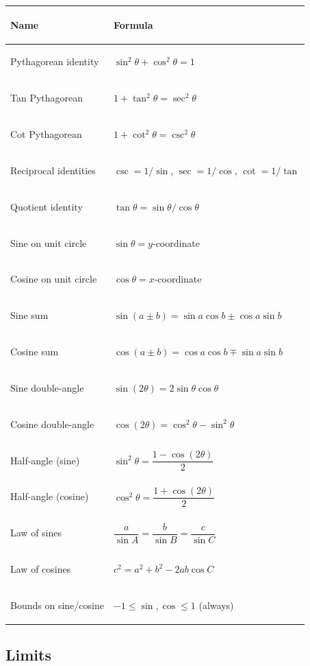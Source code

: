 \documentclass[11pt, letterpaper]{article}
\begin{document}
\noindent
{\small\renewcommand{\arraystretch}{1.6}
\begin{tabularx}{\textwidth}{>{\bfseries\raggedright\arraybackslash}p{4cm}
                              >{\raggedright\arraybackslash}X}
\toprule
\rowcolor{tableheaderpurple}
\textbf{Name} & \textbf{Formula} \\
\midrule
\rowcolor{rowPu} Pythagorean identity     & $\sin^2\theta + \cos^2\theta = 1$ \\
\rowcolor{rowA}  Tan Pythagorean          & $1 + \tan^2\theta = \sec^2\theta$ \\
\rowcolor{rowPu} Cot Pythagorean          & $1 + \cot^2\theta = \csc^2\theta$ \\
\rowcolor{rowA}  Reciprocal identities    & $\csc = 1/\sin$, \; $\sec = 1/\cos$, \; $\cot = 1/\tan$ \\
\rowcolor{rowPu} Quotient identity        & $\tan\theta = \sin\theta / \cos\theta$ \\
\rowcolor{rowA}  Sine on unit circle      & $\sin\theta = y$-coordinate \\
\rowcolor{rowPu} Cosine on unit circle    & $\cos\theta = x$-coordinate \\
\rowcolor{rowA}  Sine sum                 & $\sin(a \pm b) = \sin a \cos b \pm \cos a \sin b$ \\
\rowcolor{rowPu} Cosine sum               & $\cos(a \pm b) = \cos a \cos b \mp \sin a \sin b$ \\
\rowcolor{rowA}  Sine double-angle        & $\sin(2\theta) = 2 \sin\theta \cos\theta$ \\
\rowcolor{rowPu} Cosine double-angle      & $\cos(2\theta) = \cos^2\theta - \sin^2\theta$ \\
\rowcolor{rowA}  Half-angle (sine)        & $\sin^2\theta = \dfrac{1 - \cos(2\theta)}{2}$ \\
\rowcolor{rowPu} Half-angle (cosine)      & $\cos^2\theta = \dfrac{1 + \cos(2\theta)}{2}$ \\
\rowcolor{rowA}  Law of sines             & $\dfrac{a}{\sin A} = \dfrac{b}{\sin B} = \dfrac{c}{\sin C}$ \\
\rowcolor{rowPu} Law of cosines           & $c^2 = a^2 + b^2 - 2ab\cos C$ \\
\rowcolor{rowA}  Bounds on sine/cosine    & $-1 \leq \sin, \cos \leq 1$ (always) \\
\bottomrule
\end{tabularx}}

\subsection*{Limits}
\end{document}
